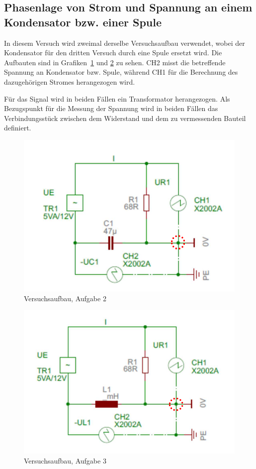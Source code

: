 \documentclass{article}
\begin{document}
\subsection{Phasenlage von Strom und Spannung an einem Kondensator bzw. einer Spule}

In diesem Versuch wird zweimal derselbe Versuchsaufbau verwendet, wobei der Kondensator für den dritten Versuch durch eine Spule ersetzt wird. Die Aufbauten sind in Grafiken~\ref{fig:aufbau_task2} und \ref{fig:aufbau_task3} zu sehen. CH2 misst die betreffende Spannung an Kondensator bzw. Spule, während CH1 für die Berechnung des dazugehörigen Stromes herangezogen wird.

Für das Signal wird in beiden Fällen ein Transformator herangezogen. Als Bezugspunkt für die Messung der Spannung wird in beiden Fällen das Verbindungsstück zwischen dem Widerstand und dem zu vermessenden Bauteil definiert.

\begin{figure}[H]
\centering
\caption{Versuchsaufbau, Aufgabe 2}
\label{fig:aufbau_task2}
\includegraphics[scale=1]{bilder/aufbau_task2.png}
\end{figure}



\begin{figure}[H]
\centering
\caption{Versuchsaufbau, Aufgabe 3}
\label{fig:aufbau_task3}
\includegraphics[scale=1]{bilder/aufbau_task3.png}
\end{figure}
\end{document}
